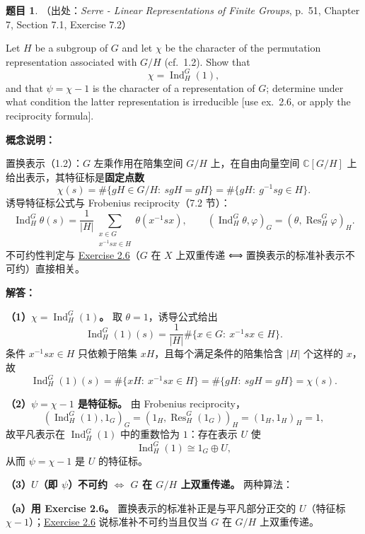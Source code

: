 \documentclass[a4paper]{ctexart}
\theoremstyle{definition}
\newtheorem{example}{题目}[section]
\theoremstyle{analysis}
\theoremstyle{plain}
\begin{document}
\begin{example}
（出处：\textit{Serre - Linear Representations of Finite Groups}, p.~51, Chapter 7, Section 7.1, Exercise 7.2）

Let \(H\) be a subgroup of \(G\) and let \(\chi\) be the character of the permutation representation associated with \(G/H\) (cf.~1.2). Show that
\[
  \chi=\operatorname{Ind}_H^G(1),
\]
and that \(\psi=\chi-1\) is the character of a representation of \(G\); determine under what condition the latter representation is irreducible [use ex.~2.6, or apply the reciprocity formula].

\textbf{概念说明：}

置换表示（1.2）：\(G\) 左乘作用在陪集空间 \(G/H\) 上，在自由向量空间 \(\mathbb C[G/H]\) 上给出表示，其特征标是\textbf{固定点数}
\[
  \chi(s)=\#\{gH\in G/H:\ sgH=gH\}
  =\#\{gH:\ g^{-1}sg\in H\}.
\]
诱导特征标公式与 Frobenius reciprocity（7.2 节）：
\[
  \operatorname{Ind}_H^G\theta(s)
  =\frac{1}{|H|}\sum_{\substack{x\in G\\ x^{-1}sx\in H}}\theta(x^{-1}sx),
  \qquad
  (\operatorname{Ind}_H^G\theta,\varphi)_G=(\theta,\operatorname{Res}_H^G\varphi)_H.
\]
不可约性判定与 \hyperref[subsec:problem-serre-permutation-double-transitive]{Exercise 2.6}（\(G\) 在 \(X\) 上双重传递 ⟺ 置换表示的标准补表示不可约）直接相关。

\textbf{解答：}

\textbf{（1）\(\chi=\operatorname{Ind}_H^G(1)\)。} 取 \(\theta=1\)，诱导公式给出
\[
  \operatorname{Ind}_H^G(1)(s)
  =\frac{1}{|H|}\#\{x\in G:\ x^{-1}sx\in H\}.
\]
条件 \(x^{-1}sx\in H\) 只依赖于陪集 \(xH\)，且每个满足条件的陪集恰含 \(|H|\) 个这样的 \(x\)，故
\[
  \operatorname{Ind}_H^G(1)(s)
  =\#\{xH:\ x^{-1}sx\in H\}
  =\#\{gH:\ sgH=gH\}
  =\chi(s).
\]

\textbf{（2）\(\psi=\chi-1\) 是特征标。} 由 Frobenius reciprocity，
\[
  (\operatorname{Ind}_H^G(1),1_G)_G=(1_H,\operatorname{Res}_H^G(1_G))_H=(1_H,1_H)_H=1,
\]
故平凡表示在 \(\operatorname{Ind}_H^G(1)\) 中的重数恰为 \(1\)：存在表示 \(U\) 使
\[
  \operatorname{Ind}_H^G(1)\cong 1_G\oplus U,
\]
从而 \(\psi=\chi-1\) 是 \(U\) 的特征标。

\textbf{（3）\(U\)（即 \(\psi\)）不可约 \(\iff\) \(G\) 在 \(G/H\) 上双重传递。} 两种算法：

\textbf{（a）用 Exercise 2.6。} 置换表示的标准补正是与平凡部分正交的 \(U\)（特征标 \(\chi-1\)）；\hyperref[subsec:problem-serre-permutation-double-transitive]{Exercise 2.6} 说标准补不可约当且仅当 \(G\) 在 \(G/H\) 上双重传递。


\end{example}
\end{document}
